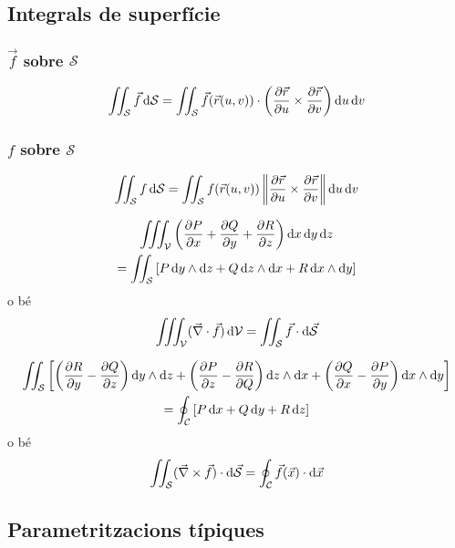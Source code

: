 \subsection*{Integrals de superfície}
\subsubsection*{$\vec{f}$ sobre $\mathcal{S}$}
\begin{align}
    \iint_{\mathcal{S}} \vec{f}  \mathop{}\!\mathrm{d} \mathcal{S} = \iint_{\mathcal{S}} \vec{f}(\vec{r}(u,v)) \cdot \left( \frac{\partial \vec{r}}{\partial u} \times \frac{\partial \vec{r}}{\partial v} \right) \mathop{}\!\mathrm{d} u \mathop{}\!\mathrm{d} v
\end{align}

\subsubsection*{$f$ sobre $\mathcal{S}$}
\begin{align}
    \iint_{\mathcal{S}} f  \mathop{}\!\mathrm{d} \mathcal{S} = \iint_{\mathcal{S}} f(\vec{r}(u,v)) \left\| \frac{\partial \vec{r}}{\partial u} \times \frac{\partial \vec{r}}{\partial v} \right\| \mathop{}\!\mathrm{d} u \mathop{}\!\mathrm{d} v
\end{align}

\begin{thm}[Gauss]
	\begin{align}
    \begin{gathered}
	    \iiint_{\mathcal{V}} \left( \frac{\partial P}{\partial x} + \frac{\partial Q}{\partial y} + \frac{\partial R}{\partial z} \right) \mathop{}\!\mathrm{d} x \mathop{}\!\mathrm{d} y \mathop{}\!\mathrm{d} z \\
		= \iint_{\mathcal{S}} \left[ P \mathop{}\!\mathrm{d} y \wedge \mathrm{d} z + Q \mathop{}\!\mathrm{d} z \wedge \mathrm{d} x + R \mathop{}\!\mathrm{d} x \wedge \mathrm{d} y \right]
	\end{gathered}
	\end{align}
	o bé 
	\begin{align}
	    \iiint_{\mathcal{V}} (\vec{\nabla} \cdot \vec{f}) \mathop{}\!\mathrm{d} \mathcal{V} = \iint_{\mathcal{S}} \vec{f} \cdot \mathrm{d} \vec{\mathcal{S}}
    \end{align}
\end{thm}

\begin{thm}[Stokes]
\begin{align}
	\begin{gathered}
		\iint_{\mathcal{S}} \left[ \left( \frac{\partial R}{\partial y} - \frac{\partial Q}{\partial z} \right) \mathop{}\!\mathrm{d} y \wedge \mathrm{d} z + \left( \frac{\partial P}{\partial z} - \frac{\partial R}{\partial Q} \right) \mathop{}\!\mathrm{d} z \wedge \mathrm{d} x + \left( \frac{\partial Q}{\partial x} - \frac{\partial P}{\partial y} \right) \mathop{}\!\mathrm{d} x \wedge \mathrm{d} y \right] \\
		= \oint_{\mathcal{C}} \left[ P \mathop{}\!\mathrm{d} x + Q \mathop{}\!\mathrm{d} y + R \mathop{}\!\mathrm{d} z \right]
	\end{gathered}
	\end{align}
    o bé
    \begin{align}
    	\iint_{\mathcal{S}} (\vec{\nabla} \times \vec{f}) \cdot \mathrm{d} \vec{\mathcal{S}} = \oint_{\mathcal{C}} \vec{f}(\vec{x}) \cdot \mathrm{d} \vec{x}
    \end{align}
\end{thm}

\subsection*{Parametritzacions típiques}
